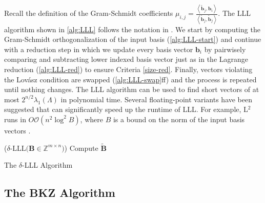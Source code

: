 Recall the definition of the Gram-Schmidt coefficients $\mu_{i, j} = \frac{\left\langle \tilde{\mathbf{b}}_j, \mathbf{b}_i\right\rangle}{\left\langle \tilde{\mathbf{b}}_j, \tilde{\mathbf{b}}_j\right\rangle}$. The LLL algorithm shown in \cref{alg:LLL} follows the notation in \cite{LLLReg04}. We start by computing the Gram-Schmidt orthogonalization of the input basis (\cref{alg:LLL-start}) and continue with a reduction step in which we update every basis vector $\mathbf{b}_i$ by pairwisely comparing and subtracting lower indexed basis vector just as in the Lagrange reduction (\cref{alg:LLL-red}) to ensure Criteria \ref{size-red}. Finally, vectors violating the Lovász condition are swapped (\cref{alg:LLL-swap}ff) and the process is repeated until nothing changes. The LLL algorithm can be used to find short vectors of at most $2^{n/2} \lambda_1(\Lambda)$ in polynomial time. Several floating-point variants have been suggested that can significantly speed up the runtime of LLL. For example, L$^2$ runs in $O\mathcal{O}(n^2 \log^2 B)$, where $B$ is a bound on the norm of the input basis vectors \cite{NS05}. %

\begin{algorithm2e}
\Begin($\delta\text{-LLL} {(}\mathbf{B} \in \mathbb{Z}^{m\times n} {)}$) %
{
  Compute $\tilde{\mathbf{B}}$\label{alg:LLL-start}\\
}
\caption{The $\delta$-LLL Algorithm} \label{alg:LLL}
\end{algorithm2e}



\subsection{The BKZ Algorithm} \label{sec:BKZ}

